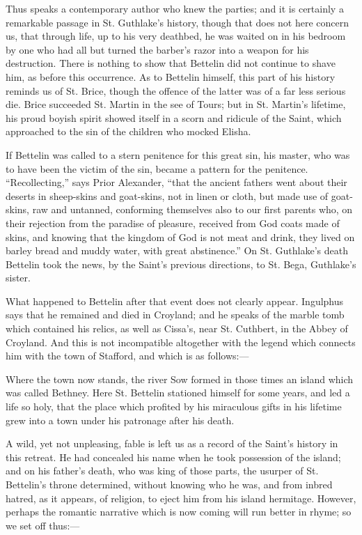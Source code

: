Thus speaks a contemporary author who knew the
parties; and it is certainly a remarkable passage in St. Guthlake's
history, though that does not here concern us, that through life, up
to his very deathbed, he was waited on in his bedroom by one who had
all but turned the barber's razor into a weapon for his destruction.
There is nothing to show that Bettelin did not continue to shave him,
as before this occurrence. As to Bettelin himself, this part of his
history reminds us of St. Brice, though the offence of the latter was
of a far less serious die. Brice succeeded St. Martin in the see of
Tours; but in St. Martin's lifetime, his proud boyish spirit
showed itself in a scorn and ridicule of the Saint, which approached
to the sin of the children who mocked Elisha.

If Bettelin was called to a stern penitence for
this great sin, his master, who was to have been the victim of the
sin, became a pattern for the penitence. ``Recollecting,'' says Prior
Alexander, ``that the ancient fathers went about their deserts in
sheep-skins and goat-skins, not in linen or cloth, but made use of
goat-skins, raw and untanned, conforming themselves also to our first
parents who, on their rejection from the paradise of pleasure,
received from God coats made of skins, and knowing that the kingdom of
God is not meat and drink, they lived on barley bread and muddy water,
with great abstinence.'' On St. Guthlake's death Bettelin took the
news, by the Saint's previous directions, to St. Bega, Guthlake's
sister.

What happened to Bettelin after that event does
not clearly appear. Ingulphus says that he remained and died in
Croyland; and he speaks of the marble tomb which contained his relics,
as well as Cissa's, near St. Cuthbert, in the Abbey of Croyland. And
this is not incompatible altogether with the legend which connects him
with the town of Stafford, and which is as follows:—

Where the town now stands, the river Sow formed
in those times an island which was called Bethney. Here St. Bettelin
stationed himself for some years, and led a life so holy, that the
place which profited by his miraculous gifts in his lifetime grew into
a town under his patronage after his death.

A wild, yet not unpleasing, fable is left us as a
record of the Saint's history in this retreat. He had concealed his
name when he took possession of the island; and on his father's death,
who was king of those parts, the usurper of St. Bettelin's throne
determined, without knowing who he was, and from inbred hatred, as it
appears, of religion, to eject him from his island hermitage. However,
perhaps the romantic narrative which is now coming will run better in
rhyme; so we set off thus:—

